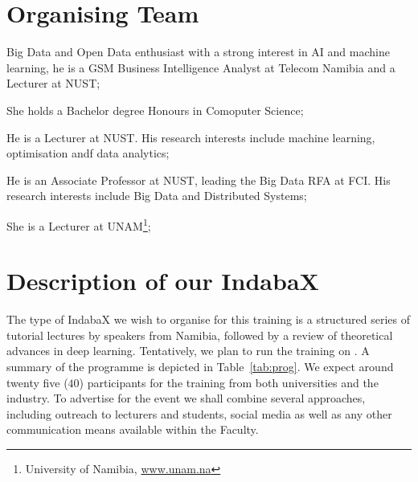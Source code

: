 \documentclass[10pt]{article}
\begin{document}
\section{Organising Team}
\label{sec:org-team}

\begin{description}[align=left]
    \item[Lameck M. Amugongo] Big Data and Open Data enthusiast with a strong interest in AI and machine learning, he is a GSM Business Intelligence Analyst at
    Telecom Namibia and a Lecturer at NUST;
    \item[Suoma Hangula] She holds a Bachelor degree Honours in Comoputer Science;
    \item[Cameron Macrae] He is a Lecturer at NUST. His research interests include machine learning, optimisation andf data analytics;
    \item[Jos\'{e} G. Quenum] He is an Associate Professor at NUST, leading the Big Data RFA at FCI. His research interests include Big Data and Distributed
    Systems;
    \item[Annastasia Shipepe] She is a Lecturer at UNAM\footnote{University of Namibia, \url{www.unam.na}};
    
\end{description}

\section{Description of our IndabaX}
\label{sec:indaba-format}


The type of IndabaX we wish to organise for this training is a structured series of tutorial lectures by speakers from Namibia, followed by a review of theoretical advances in deep learning. Tentatively, we plan to run the training on . A summary of the programme is depicted in Table~\ref{tab:prog}.
We expect around twenty five ($40$) participants for the training from both universities and the industry. To advertise for the event we shall combine several
 approaches, including outreach to lecturers and students, social media as well as any other communication means available within the Faculty.
\end{document}

